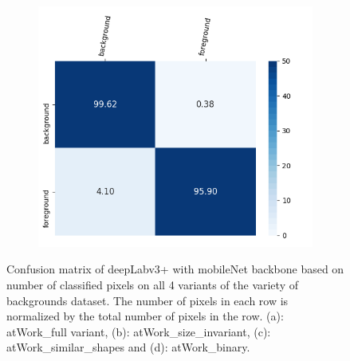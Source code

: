 \begin{figure}
			\begin{subfigure}{.3\textwidth}
				\centering
				\includegraphics[width=0.9\linewidth]{images/cm_binary}
				\caption{}
			\end{subfigure}
			\caption{Confusion matrix of deepLabv3+ with mobileNet backbone based on number of classified pixels on all 4 variants of the variety of backgrounds dataset. The number of pixels in each row is normalized by the total number of pixels in the row. (a): atWork\_full variant, (b): atWork\_size\_invariant, (c): atWork\_similar\_shapes and (d): atWork\_binary.}
			\label{Fig:cm}
		\end{figure}
	
